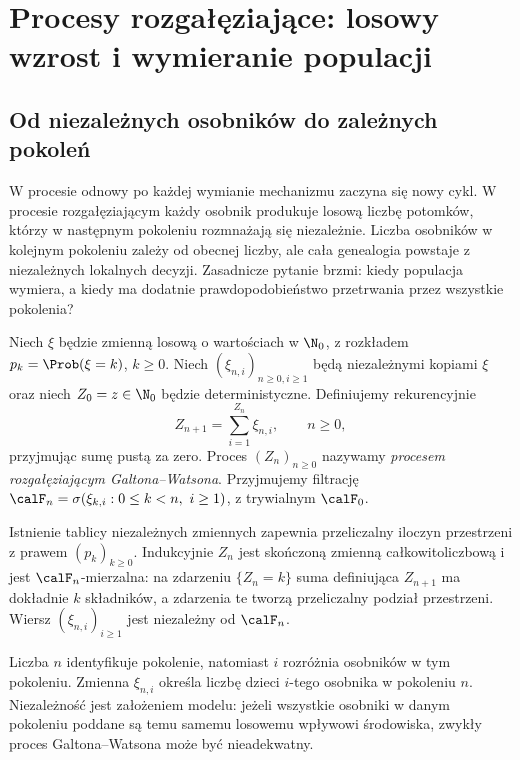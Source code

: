 \chapter{Procesy rozgałęziające: losowy wzrost i wymieranie populacji}
\label{ch:branching}

\section{Od niezależnych osobników do zależnych pokoleń}
W procesie odnowy po każdej wymianie mechanizmu zaczyna się nowy
cykl. W procesie rozgałęziającym każdy osobnik produkuje losową
liczbę potomków, którzy w następnym pokoleniu rozmnażają się niezależnie.
Liczba osobników w kolejnym pokoleniu zależy od obecnej liczby,
ale cała genealogia powstaje z niezależnych lokalnych decyzji.
Zasadnicze pytanie brzmi: kiedy populacja wymiera, a kiedy ma
dodatnie prawdopodobieństwo przetrwania przez wszystkie pokolenia?

\begin{definicja}
Niech $\xi$ będzie zmienną losową o wartościach w $\N_0$,
z rozkładem $p_k=\Prob(\xi=k)$, $k\ge0$.
Niech $(\xi_{n,i})_{n\ge0,i\ge1}$ będą niezależnymi kopiami
$\xi$ oraz niech $Z_0=z\in\N_0$ będzie deterministyczne.
Definiujemy rekurencyjnie
\[
Z_{n+1}=\sum_{i=1}^{Z_n}\xi_{n,i},\qquad n\ge0,
\]
przyjmując sumę pustą za zero. Proces $(Z_n)_{n\ge0}$
nazywamy \emph{procesem rozgałęziającym Galtona--Watsona}.
Przyjmujemy filtrację
$\calF_n=\sigma(\xi_{k,i}:0\le k<n,\ i\ge1)$,
z trywialnym $\calF_0$.
\end{definicja}

Istnienie tablicy niezależnych zmiennych zapewnia
przeliczalny iloczyn przestrzeni z prawem $(p_k)_{k\ge0}$.
Indukcyjnie $Z_n$ jest skończoną zmienną całkowitoliczbową
i jest $\calF_n$-mierzalna: na zdarzeniu $\{Z_n=k\}$
suma definiująca $Z_{n+1}$ ma dokładnie $k$ składników,
a zdarzenia te tworzą przeliczalny podział przestrzeni.
Wiersz $(\xi_{n,i})_{i\ge1}$ jest niezależny od $\calF_n$.

\begin{uwaga}
Liczba $n$ identyfikuje pokolenie, natomiast $i$ rozróżnia
osobników w tym pokoleniu. Zmienna $\xi_{n,i}$ określa liczbę
dzieci $i$-tego osobnika w pokoleniu $n$. Niezależność jest
założeniem modelu: jeżeli wszystkie osobniki w danym pokoleniu
poddane są temu samemu losowemu wpływowi środowiska, zwykły
proces Galtona--Watsona może być nieadekwatny.
\end{uwaga}

